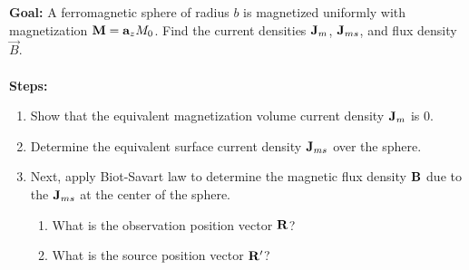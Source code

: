 \documentclass[../../header.tex]{subfiles}
\begin{document}
\textbf{Goal:} A ferromagnetic sphere of radius $b$ is magnetized uniformly with magnetization $\mathbf{M} = \mathbf{a}_z M_0$. Find the current densities $\mathbf{J}_m$,  $\mathbf{J}_{ms}$, and flux density $\vec{B}$.\\
\\
\textbf{Steps:} 
\begin{enumerate}
\item Show that the equivalent magnetization volume current density $\mathbf{J}_m$ is 0.\\

\item Determine the equivalent surface current density $\mathbf{J}_{ms}$ over the sphere.\\

\item Next, apply Biot-Savart law to determine the magnetic flux density $\mathbf{B}$ due to the $\mathbf{J}_{ms}$ at the center of the sphere.\\
\begin{enumerate}
\item What is the observation position vector $\mathbf{R}$?\\

\item What is the source position vector $\mathbf{R}'$? \\


\end{enumerate}
\end{enumerate}
\end{document}
